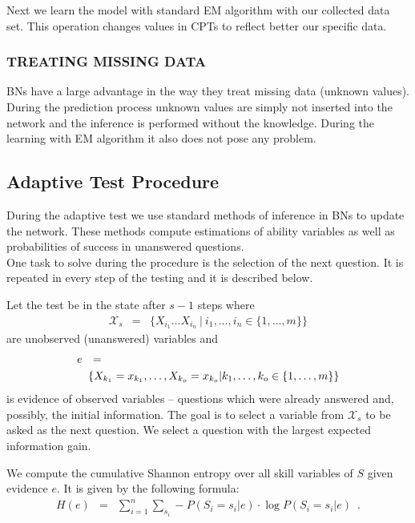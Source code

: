 Next we learn the model with standard EM algorithm with our collected data set. This operation changes values in CPTs to reflect better our specific data.

\subsubsection{TREATING MISSING DATA}
BNs have a large advantage in the way they treat missing data (unknown values). During the prediction process unknown values are simply not inserted into the network and the inference is performed without the knowledge. During the learning with EM algorithm it also does not pose any problem.

\subsection{Adaptive Test Procedure}
During the adaptive test we use standard methods of inference in BNs to update the network. These methods compute estimations of ability variables as well as probabilities of success in unanswered questions.\\
One task to solve during the procedure is the selection of the next question. It is repeated in every step of the testing and it is described below.

Let the test be in the state after $s-1$ steps where 
\begin{eqnarray*}
\mathcal{X}_s & = & \{X_{i_1}\ldots X_{i_n} \ | \ i_1,\ldots,i_n \in \{1,\ldots,m\}\}
\end{eqnarray*}
are unobserved (unanswered) variables and 
\small
\begin{eqnarray*}
\lefteqn{e \ \ =}\\
 & & \{X_{k_1} = x_{k_1},\ldots,X_{k_o} = x_{k_o} | k_1,\ldots,k_o \in \{1,\ldots,m\}\} 
\end{eqnarray*}
\normalsize
is evidence of observed variables -- questions which were already answered and, possibly, the initial information. 
The goal is to select a variable from $\mathcal{X}_s$ to be asked as the next question. 
We select a question with the largest expected information gain. 

We compute the cumulative Shannon entropy over all skill variables of $S$ given evidence $e$.
It is given by the following formula:
\begin{eqnarray*}
H(e) & = & \sum_{i = 1}^n \sum_{s_i} -P(S_i=s_i|e) \cdot \log P(S_i=s_i|e) \enspace .
\end{eqnarray*}

